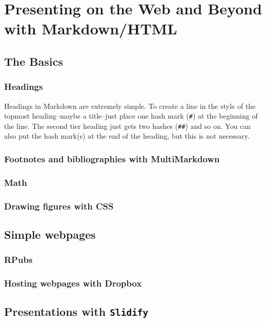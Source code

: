 \documentclass[ChapterTOCs,krantz1]{krantz}\usepackage{graphicx, color}
\begin{document}
\chapter{Presenting on the Web and Beyond with Markdown/HTML}

\section{The Basics}

\subsection{Headings}

Headings in Markdown are extremely simple. To create a line in the style
of the topmost heading--maybe a title--just place one hash mark
(\texttt{\#}) at the beginning of the line. The second tier heading just
gets two hashes (\texttt{\#\#}) and so on. You can also put the hash
mark(s) at the end of the heading, but this is not necessary.

\subsection{Footnotes and bibliographies with MultiMarkdown}

\subsection{Math}

\subsection{Drawing figures with CSS}

\section{Simple webpages}

\subsection{RPubs}

\subsection{Hosting webpages with Dropbox}

\section{Presentations with \texttt{Slidify}}
\end{document}
